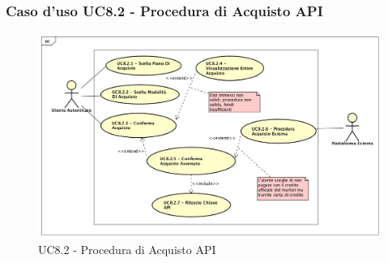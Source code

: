 
\subsubsection{Caso d'uso UC8.2 - Procedura di Acquisto API}
\label{UC8.2}
\begin{figure}[ht]
	\centering
	\includegraphics[scale=0.45]{UML/UC8_2.png}
	\caption{UC8.2 - Procedura di Acquisto API}
\end{figure}
\FloatBarrier
